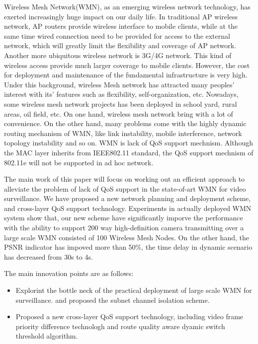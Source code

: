 \begin{eabstract}
Wireless Mesh Network(WMN), as an emerging wireless network technology, has exerted
increasingly huge impact on our daily life. In traditional AP wireless network,
AP routers provide wireless interface to mobile clients, while at the same time 
wired connection need to be provided for access to the external network, which 
will greatly limit the flexibility and coverage of AP network. Another more
ubiquitous wireless network is 3G/4G network. This kind of wireless access provide
much larger coverage to mobile clients. However, the cost for deployment and 
maintenance of the fundamental infrastructure is very high. Under this background, 
wireless Mesh network has attracted many peoples' interest with its' features
such as flexibility, self-organization, etc. Nowadays, some 
wireless mesh network projects has been deployed in school yard, rural areas, 
oil field, etc. On one hand, wireless mesh network bring with a lot of convenience.
On the other hand, many problems come with the highly dynamic routing mechanism
of WMN, like link instability, mobile interference, network topology instability 
and so on. WMN is lack of QoS support mechnism. Although the MAC layer inherits from 
IEEE802.11 standard, the QoS support mechnism of 802.11e will not be supported in
ad hoc network.

The main work of this paper will focus on working out an efficient approach
to alleviate the problem of lack of QoS support in the state-of-art WMN for 
video surveillance. We have proposed a new network planning and deployment scheme, 
and cross-layer QoS support technology. Experiments in actually 
deployed WMN system show that, our new scheme have significantly imporve the 
performance with the ability to support 200 way high-definition camera transmitting
over a large scale WMN consisted of 100 Wireless Mesh Nodes. On the other hand, 
the PSNR indicator has impoved more than 50\%, the time delay in dynamic scenario
has decreased from 30s to 4s.

The main innovation points are as follows:
\begin{itemize}
\item Explorint the bottle neck of the practical deployment of large scale WMN for surveillance.
and proposed the subnet channel isolation scheme.
\item Proposed a new cross-layer QoS support technology, including video
frame priority difference technologh and route quality aware dyamic switch threshold
algorithm.
\end{itemize}
\end{eabstract}

